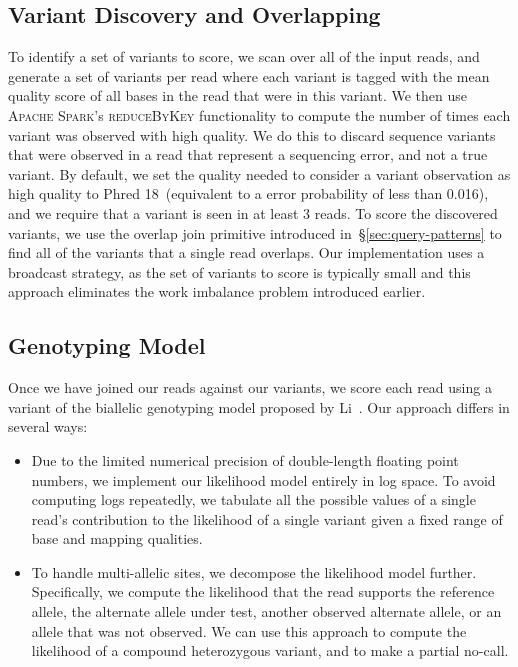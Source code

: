 \documentclass[phd]{ucbthesis}
\begin{document}
\subsection{Variant Discovery and Overlapping}
\label{sec:discovery}

To identify a set of variants to score, we scan over all of the input reads,
and generate a set of variants per read where each variant is tagged with the
mean quality score of all bases in the read that were in this variant. We then
use \textsc{Apache Spark}'s \textsc{reduceByKey} functionality to compute
the number of times each variant was observed with high quality. We do this
to discard sequence variants that were observed in a read that represent a
sequencing error, and not a true variant. By default, we set the quality
needed to consider a variant observation as high quality to Phred 18~(equivalent
to a error probability of less than 0.016), and we require that a variant is
seen in at least 3 reads. To score the discovered variants, we use the overlap
join primitive introduced in~\S\ref{sec:query-patterns} to find all of the
variants that a single read overlaps. Our implementation uses a broadcast
strategy, as the set of variants to score is typically small and this approach
eliminates the work imbalance problem introduced earlier.

\subsection{Genotyping Model}
\label{sec:genotyping-model}

Once we have joined our reads against our variants, we score each read using
a variant of the biallelic genotyping model proposed by Li~\cite{li11}. Our
approach differs in several ways:

\begin{itemize}
\item Due to the limited numerical precision of double-length floating point
  numbers, we implement our likelihood model entirely in log space. To avoid
  computing logs repeatedly, we tabulate all the possible values of a single
  read's contribution to the likelihood of a single variant given a fixed range
  of base and mapping qualities.
\item To handle multi-allelic sites, we decompose the likelihood model further.
  Specifically, we compute the likelihood that the read supports the reference
  allele, the alternate allele under test, another observed alternate allele,
  or an allele that was not observed. We can use this approach to compute the
  likelihood of a compound heterozygous variant, and to make a partial no-call.
\end{itemize}
\end{document}
